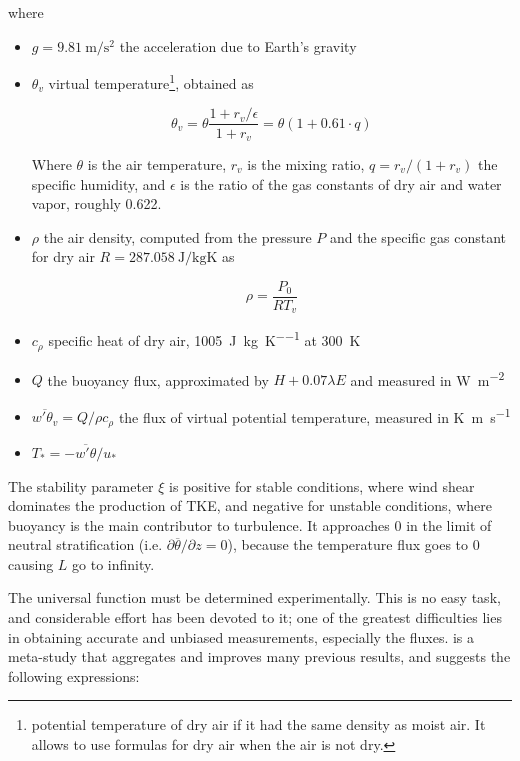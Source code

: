 \documentclass[a4paper]{book}
\begin{document}
\noindent where

\begin{itemize}
\item $g=\SI{9.81}{\meter\per\square\second}$ the acceleration due to Earth's gravity

\item $\theta_v$ virtual temperature\footnote{potential temperature of dry air if it had the same density as moist air. It allows to use formulas for dry air when the air is not dry.}, obtained as

\begin{equation}
\label{eq:vtemp}
\theta_v=\theta\frac{1+r_v/\epsilon}{1+r_v}=\theta(1+0.61\cdot q)
\end{equation}

Where $\theta$ is the air temperature, $r_v$ is the mixing ratio, $q=r_v/(1+r_v)$ the specific humidity, and $\epsilon$ is the ratio of the gas constants of dry air and water vapor, roughly 0.622.

\item $\rho$ the air density, computed from the pressure $P$ and the specific gas constant for dry air $R=\SI{287.058}{\joule\per\kilo\gram\kelvin}$ as

$$
\rho=\frac{P_0}{RT_v}
$$


\item $c_\rho$ specific heat of dry air, \SI{1005}{\joule\per\kilo\gram\per\kelvin} at \SI{300}{\kelvin}
\item $Q$ the buoyancy flux, approximated by $H+0.07\lambda E$ and measured in \si{\watt\per\square\meter}
\item $\overline{w'\theta_v}=Q/\rho c_\rho$ the flux of virtual potential temperature, measured in \si{\kelvin\meter\per\second}
\item $T_*=-\overline{w'\theta}/u_*$
\end{itemize}

The stability parameter $\xi$ is positive for stable conditions, where wind shear dominates the production of TKE, and negative for unstable conditions, where buoyancy is the main contributor to turbulence. It approaches 0 in the limit of neutral stratification (i.e. $\partial\overline{\theta}/\partial z=0$), because the temperature flux goes to 0 causing $L$ go to infinity.

The universal function must be determined experimentally. This is no easy task, and considerable effort has been devoted to it; one of the greatest difficulties lies in obtaining accurate and unbiased measurements, especially the fluxes. \cite{hogstrom88} is a meta-study that aggregates and improves many previous results, and suggests the following expressions:
\end{document}
